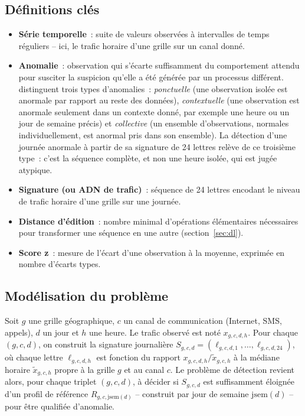 \subsection{Définitions clés}

\begin{itemize}
  \item \textbf{Série temporelle}~: suite de valeurs observées à
        intervalles de temps réguliers -- ici, le trafic horaire
        d'une grille sur un canal donné.
  \item \textbf{Anomalie}~: observation qui s'écarte suffisamment du
        comportement attendu pour susciter la suspicion qu'elle a été
        générée par un processus différent. \textcite{chandola2009anomaly}
        distinguent trois types d'anomalies~: \emph{ponctuelle} (une
        observation isolée est anormale par rapport au reste des
        données), \emph{contextuelle} (une observation est anormale
        seulement dans un contexte donné, par exemple une heure ou un
        jour de semaine précis) et \emph{collective} (un ensemble
        d'observations, normales individuellement, est anormal pris
        dans son ensemble). La détection d'une journée anormale à
        partir de sa signature de 24 lettres relève de ce troisième
        type~: c'est la séquence complète, et non une heure isolée,
        qui est jugée atypique.
  \item \textbf{Signature (ou ADN de trafic)}~: séquence de 24
        lettres encodant le niveau de trafic horaire d'une grille sur
        une journée.
  \item \textbf{Distance d'édition}~: nombre minimal d'opérations
        élémentaires nécessaires pour transformer une séquence en une
        autre (section~\ref{sec:dl}).
  \item \textbf{Score z}~: mesure de l'écart d'une observation à la
        moyenne, exprimée en nombre d'écarts types.
\end{itemize}

\subsection{Modélisation du problème}

Soit $g$ une grille géographique, $c$ un canal de communication
(Internet, SMS, appels), $d$ un jour et $h$ une heure. Le trafic
observé est noté $x_{g,c,d,h}$. Pour chaque $(g,c,d)$, on construit la
signature journalière $S_{g,c,d} = (\ell_{g,c,d,1}, \dots,
\ell_{g,c,d,24})$, où chaque lettre $\ell_{g,c,d,h}$ est fonction du
rapport $x_{g,c,d,h} / \tilde{x}_{g,c,h}$ à la médiane horaire
$\tilde{x}_{g,c,h}$ propre à la grille $g$ et au canal $c$. Le
problème de détection revient alors, pour chaque triplet $(g,c,d)$, à
décider si $S_{g,c,d}$ est suffisamment éloignée d'un profil de
référence $R_{g,c,\mathrm{jsem}(d)}$ -- construit par jour de semaine
$\mathrm{jsem}(d)$ -- pour être qualifiée d'anomalie.

